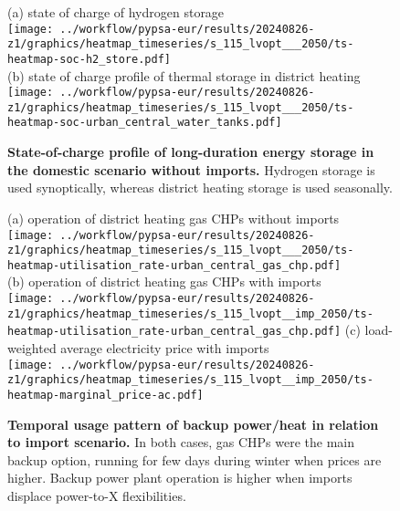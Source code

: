 \begin{figure*}
    \centering
    \footnotesize
    (a) state of charge of hydrogen storage \\
    \texttt{[image: ../workflow/pypsa-eur/results/20240826-z1/graphics/heatmap\_timeseries/s\_115\_lvopt\_\_\_2050/ts-heatmap-soc-h2\_store.pdf]} \\
    (b) state of charge profile of thermal storage in district heating \\
    \texttt{[image: ../workflow/pypsa-eur/results/20240826-z1/graphics/heatmap\_timeseries/s\_115\_lvopt\_\_\_2050/ts-heatmap-soc-urban\_central\_water\_tanks.pdf]}
    \caption{\textbf{State-of-charge profile of long-duration energy storage in
    the domestic scenario without imports.} Hydrogen storage is used
    synoptically, whereas district heating storage is used seasonally.}
    \label{fig:si:storage-operation}
\end{figure*}

\begin{figure*}
    \centering
    \footnotesize
    (a) operation of district heating gas CHPs without imports  \\
    \texttt{[image: ../workflow/pypsa-eur/results/20240826-z1/graphics/heatmap\_timeseries/s\_115\_lvopt\_\_\_2050/ts-heatmap-utilisation\_rate-urban\_central\_gas\_chp.pdf]} \\
    (b) operation of district heating gas CHPs with imports \\
    \texttt{[image: ../workflow/pypsa-eur/results/20240826-z1/graphics/heatmap\_timeseries/s\_115\_lvopt\_\_imp\_2050/ts-heatmap-utilisation\_rate-urban\_central\_gas\_chp.pdf]}
    (c) load-weighted average electricity price with imports \\
    \texttt{[image: ../workflow/pypsa-eur/results/20240826-z1/graphics/heatmap\_timeseries/s\_115\_lvopt\_\_imp\_2050/ts-heatmap-marginal\_price-ac.pdf]}
    \caption{\textbf{Temporal usage pattern of backup power/heat in relation to
    import scenario.} In both cases, gas CHPs were the main backup option,
    running for few days during winter when prices are higher. Backup power
    plant operation is higher when imports displace power-to-X flexibilities.}
    \label{fig:si:backup-power}
\end{figure*}

